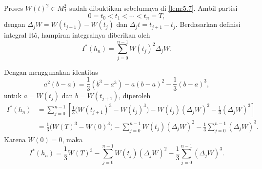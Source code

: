 \documentclass[aspectratio=169,11pt]{beamer}
\theoremstyle{definition}
\newcommand{\myref}[1]{\hyperref[#1]{\nameCref{#1} \ref*{#1}}}
\begin{document}
\begin{frame}[allowframebreaks]{\insertsection}{\insertsubsection}
  Proses $W(t)^2 \in M_T^2$ sudah dibuktikan sebelumnya di \myref{lem:5.7}.
  Ambil partisi
  \[
    0=t_0<t_1<\cdots<t_n=T,
  \]
  dengan $\Delta_j W=W(t_{j+1})-W(t_j)$ dan
  $\Delta_j t=t_{j+1}-t_j$. Berdasarkan definisi integral Itô, hampiran
  integralnya diberikan oleh
  \[
    I^*(h_n)
    =
    \sum_{j=0}^{n-1} W(t_j)^2\Delta_j W.
  \]

  Dengan menggunakan identitas
  \[
    a^2(b-a)
    =
    \frac{1}{3}(b^3-a^3)
    -
    a(b-a)^2
    -
    \frac{1}{3}(b-a)^3,
  \]
  untuk $a=W(t_j)$ dan $b=W(t_{j+1})$, diperoleh
  \[
    \begin{aligned}
      I^*(h_n)
       & =
      \sum_{j=0}^{n-1}
      \left[
        \frac{1}{3}\bigl(W(t_{j+1})^3-W(t_j)^3\bigr)
        -
        W(t_j)(\Delta_j W)^2
        -
        \frac{1}{3}(\Delta_j W)^3
        \right] \\
       & =
      \frac{1}{3}\bigl(W(T)^3-W(0)^3\bigr)
      -
      \sum_{j=0}^{n-1}W(t_j)(\Delta_j W)^2
      -
      \frac{1}{3}\sum_{j=0}^{n-1}(\Delta_j W)^3.
    \end{aligned}
  \]
  Karena $W(0)=0$, maka
  \[
    I^*(h_n)
    =
    \frac{1}{3}W(T)^3
    -
    \sum_{j=0}^{n-1}W(t_j)(\Delta_j W)^2
    -
    \frac{1}{3}\sum_{j=0}^{n-1}(\Delta_j W)^3.
  \]


\end{frame}
\end{document}
